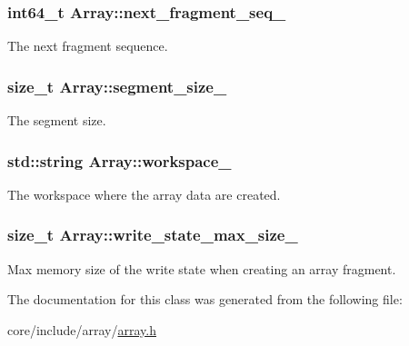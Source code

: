 \subsubsection[{next\+\_\+fragment\+\_\+seq\+\_\+}]{\setlength{\rightskip}{0pt plus 5cm}int64\+\_\+t Array\+::next\+\_\+fragment\+\_\+seq\+\_\+\hspace{0.3cm}{\ttfamily [private]}}\label{classArray_a7872787919cfff80a1205372c9ec440c}
The next fragment sequence. \hypertarget{classArray_aebadf41b4ba237440d26a448a6092bd4}{}
\subsubsection[{segment\+\_\+size\+\_\+}]{\setlength{\rightskip}{0pt plus 5cm}size\+\_\+t Array\+::segment\+\_\+size\+\_\+\hspace{0.3cm}{\ttfamily [private]}}\label{classArray_aebadf41b4ba237440d26a448a6092bd4}
The segment size. \hypertarget{classArray_acb0d651fc80fd7a93a1aafdaa62c87c2}{}
\subsubsection[{workspace\+\_\+}]{\setlength{\rightskip}{0pt plus 5cm}std\+::string Array\+::workspace\+\_\+\hspace{0.3cm}{\ttfamily [private]}}\label{classArray_acb0d651fc80fd7a93a1aafdaa62c87c2}
The workspace where the array data are created. \hypertarget{classArray_a09b22ce501ae511eaee253066a3ea1e3}{}
\subsubsection[{write\+\_\+state\+\_\+max\+\_\+size\+\_\+}]{\setlength{\rightskip}{0pt plus 5cm}size\+\_\+t Array\+::write\+\_\+state\+\_\+max\+\_\+size\+\_\+\hspace{0.3cm}{\ttfamily [private]}}\label{classArray_a09b22ce501ae511eaee253066a3ea1e3}
Max memory size of the write state when creating an array fragment. 

The documentation for this class was generated from the following file\+:\begin{DoxyCompactItemize}
\item 
core/include/array/\hyperlink{array_8h}{array.\+h}\end{DoxyCompactItemize}
